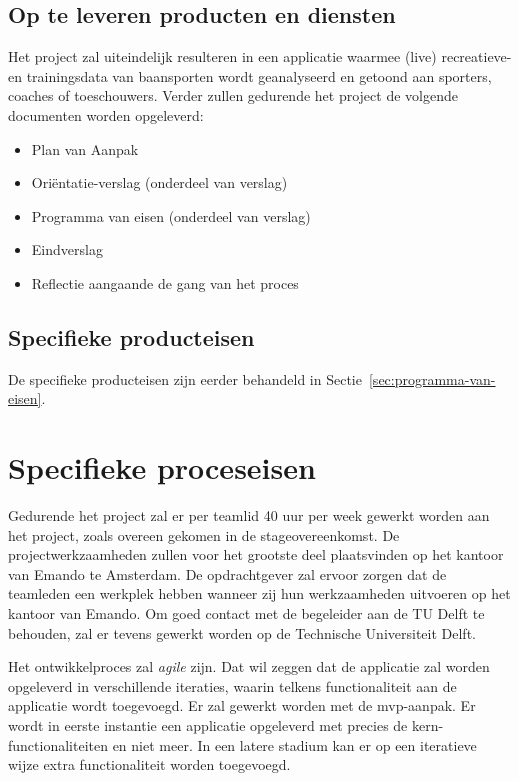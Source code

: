 

\subsection{Op te leveren producten en diensten}
Het project zal uiteindelijk resulteren in een applicatie waarmee (live) recreatieve- en trainingsdata van baansporten wordt geanalyseerd en getoond aan sporters, coaches of toeschouwers. Verder zullen gedurende het project de volgende documenten worden opgeleverd: \begin{itemize}
\item Plan van Aanpak
\item Oriëntatie-verslag (onderdeel van verslag)
\item Programma van eisen (onderdeel van verslag)
\item Eindverslag
\item Reflectie aangaande de gang van het proces
\end{itemize}

\subsection{Specifieke producteisen}

\ifx\programmavaneisen\undefined

\else
De specifieke producteisen zijn eerder behandeld in Sectie~\ref{sec:programma-van-eisen}.
\fi

\section{Specifieke proceseisen}
Gedurende het project zal er per teamlid 40 uur per week gewerkt worden aan het project, zoals overeen gekomen in de stageovereenkomst.
De projectwerkzaamheden zullen voor het grootste deel plaatsvinden op het kantoor van Emando te Amsterdam. 
De opdrachtgever zal ervoor zorgen dat de teamleden een werkplek hebben wanneer zij hun werkzaamheden uitvoeren op het kantoor van Emando. Om goed contact met de begeleider aan de TU Delft te behouden, zal er tevens gewerkt worden op de Technische Universiteit Delft.

Het ontwikkelproces zal \textit{agile} zijn. Dat wil zeggen dat de applicatie zal worden opgeleverd in verschillende iteraties, waarin telkens functionaliteit aan de applicatie wordt toegevoegd.
Er zal gewerkt worden met de \acl{mvp}-aanpak. Er wordt in eerste instantie een applicatie opgeleverd met precies de kern-functionaliteiten en niet meer. In een latere stadium kan er op een iteratieve wijze extra functionaliteit worden toegevoegd.

